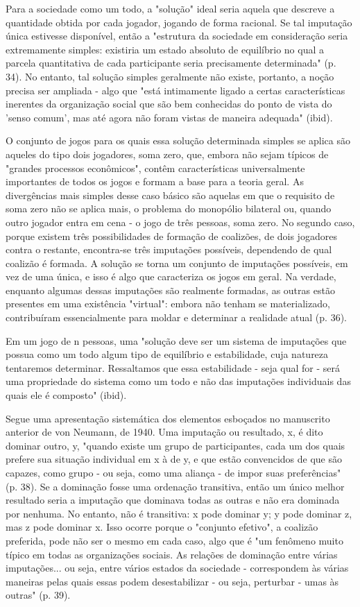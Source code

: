 \documentclass[12pt]{article}
\begin{document}
Para a sociedade como um todo, a "solução" ideal seria aquela que descreve a quantidade obtida por cada jogador, jogando de forma racional. Se tal imputação única estivesse disponível, então a "estrutura da sociedade em consideração seria extremamente simples: existiria um estado absoluto de equilíbrio no qual a parcela quantitativa de cada participante seria precisamente determinada" (p. 34). No entanto, tal solução simples geralmente não existe, portanto, a noção precisa ser ampliada - algo que "está intimamente ligado a certas características inerentes da organização social que são bem conhecidas do ponto de vista do 'senso comum', mas até agora não foram vistas de maneira adequada" (ibid).

O conjunto de jogos para os quais essa solução determinada simples se aplica são aqueles do tipo dois jogadores, soma zero, que, embora não sejam típicos de "grandes processos econômicos", contêm características universalmente importantes de todos os jogos e formam a base para a teoria geral. As divergências mais simples desse caso básico são aquelas em que o requisito de soma zero não se aplica mais, o problema do monopólio bilateral ou, quando outro jogador entra em cena - o jogo de três pessoas, soma zero. No segundo caso, porque existem três possibilidades de formação de coalizões, de dois jogadores contra o restante, encontra-se três imputações possíveis, dependendo de qual coalizão é formada. A solução se torna um conjunto de imputações possíveis, em vez de uma única, e isso é algo que caracteriza os jogos em geral. Na verdade, enquanto algumas dessas imputações são realmente formadas, as outras estão presentes em uma existência "virtual": embora não tenham se materializado, contribuíram essencialmente para moldar e determinar a realidade atual (p. 36).

Em um jogo de n pessoas, uma "solução deve ser um sistema de imputações que possua como um todo algum tipo de equilíbrio e estabilidade, cuja natureza tentaremos determinar. Ressaltamos que essa estabilidade - seja qual for - será uma propriedade do sistema como um todo e não das imputações individuais das quais ele é composto" (ibid).

Segue uma apresentação sistemática dos elementos esboçados no manuscrito anterior de von Neumann, de 1940. Uma imputação ou resultado, x, é dito dominar outro, y, "quando existe um grupo de participantes, cada um dos quais prefere sua situação individual em x à de y, e que estão convencidos de que são capazes, como grupo - ou seja, como uma aliança - de impor suas preferências" (p. 38). Se a dominação fosse uma ordenação transitiva, então um único melhor resultado seria a imputação que dominava todas as outras e não era dominada por nenhuma. No entanto, não é transitiva: x pode dominar y; y pode dominar z, mas z pode dominar x. Isso ocorre porque o "conjunto efetivo", a coalizão preferida, pode não ser o mesmo em cada caso, algo que é "um fenômeno muito típico em todas as organizações sociais. As relações de dominação entre várias imputações... ou seja, entre vários estados da sociedade - correspondem às várias maneiras pelas quais essas podem desestabilizar - ou seja, perturbar - umas às outras" (p. 39).
\end{document}

